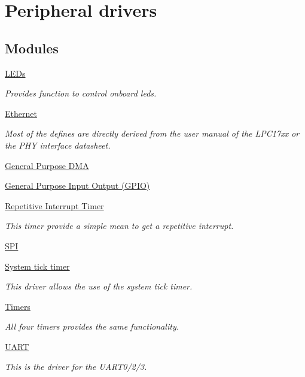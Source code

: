\hypertarget{group__drivers}{\section{Peripheral drivers}
\label{group__drivers}
}
\subsection*{Modules}
\begin{DoxyCompactItemize}
\item 
\hyperlink{group__leds}{L\-E\-Ds}
\begin{DoxyCompactList}\small\item\em Provides function to control onboard leds. \end{DoxyCompactList}\item 
\hyperlink{group__eth}{Ethernet}
\begin{DoxyCompactList}\small\item\em Most of the defines are directly derived from the user manual of the L\-P\-C17xx or the P\-H\-Y interface datasheet. \end{DoxyCompactList}\item 
\hyperlink{group__dma}{General Purpose D\-M\-A}
\item 
\hyperlink{group__gpio}{General Purpose Input Output (\-G\-P\-I\-O)}
\item 
\hyperlink{group__rit}{Repetitive Interrupt Timer}
\begin{DoxyCompactList}\small\item\em This timer provide a simple mean to get a repetitive interrupt. \end{DoxyCompactList}\item 
\hyperlink{group__spi}{S\-P\-I}
\item 
\hyperlink{group__systick}{System tick timer}
\begin{DoxyCompactList}\small\item\em This driver allows the use of the system tick timer. \end{DoxyCompactList}\item 
\hyperlink{group__timer}{Timers}
\begin{DoxyCompactList}\small\item\em All four timers provides the same functionality. \end{DoxyCompactList}\item 
\hyperlink{group__uart}{U\-A\-R\-T}
\begin{DoxyCompactList}\small\item\em This is the driver for the U\-A\-R\-T0/2/3. \end{DoxyCompactList}\end{DoxyCompactItemize}
